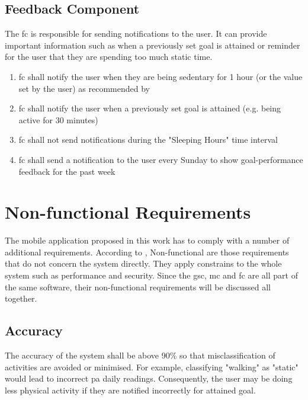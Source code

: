     \subsection{Feedback Component}
    \label{section:feedback-component}
    The \gls{fc} is responsible for sending notifications to the user. It can provide important information such as when a previously set goal is attained or reminder for the user that they are spending too much static time.
    \begin{enumerate}
        \item \gls{fc} shall notify the user when they are being sedentary for 1 hour (or the value set by the user) as recommended by \citet[]{swartz2011}
        
        \item \gls{fc} shall notify the user when a previously set goal is attained (e.g. being active for 30 minutes)
        
        \item \gls{fc} shall not send notifications during the "Sleeping Hours" time interval
        
        \item \gls{fc} shall send a notification to the user every Sunday to show goal-performance feedback for the past week
           
    \end{enumerate}

\section{Non-functional Requirements}
The mobile application proposed in this work has to comply with a number of additional requirements. According to \citet[87]{sommerville2010}, Non-functional are those requirements that do not concern the system directly. They apply constrains to the whole system such as performance and security.  Since the \gls{gsc}, \gls{mc} and \gls{fc} are all part of the same software, their non-functional requirements will be discussed all together.
    
    
    \subsection{Accuracy}
    The accuracy of the system shall be above 90\% so that misclassification of activities are avoided or minimised. For example, classifying "walking" as "static" would lead to incorrect \gls{pa} daily readings. Consequently, the user may be doing less physical activity if they are notified incorrectly for attained goal.
    
